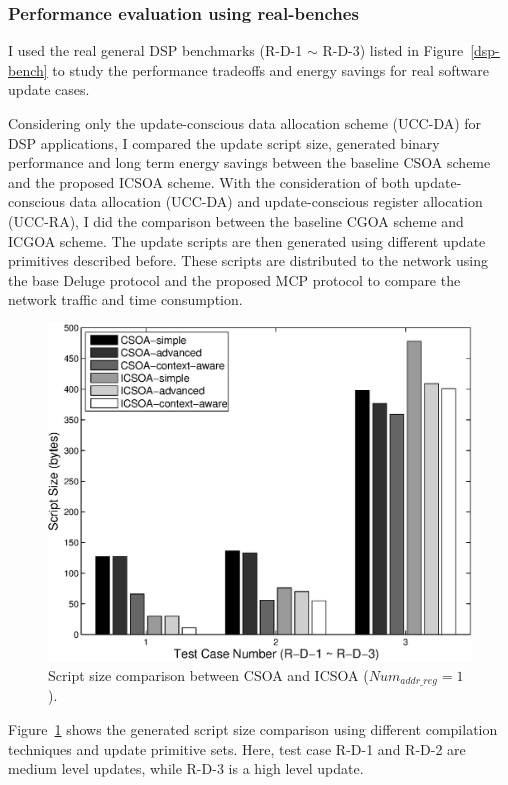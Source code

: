 \subsubsection{Performance evaluation using real-benches}
I used the real general DSP benchmarks (R-D-1 $\sim$ R-D-3)
listed in Figure~\ref{dsp-bench} to study the performance tradeoffs and
energy savings for real software update cases.

Considering only the update-conscious data allocation scheme (UCC-DA) for DSP applications,
I compared the update script size, generated binary performance and long term energy savings
between the baseline CSOA scheme and the proposed ICSOA scheme.
With the consideration of both update-conscious data allocation (UCC-DA) and update-conscious
register allocation (UCC-RA), I did the comparison between the baseline CGOA scheme and ICGOA scheme.
The update scripts are then generated using different update primitives described before. These scripts are distributed 
to the network using the base Deluge protocol and the proposed MCP protocol to compare the network traffic and time 
consumption.

\begin{figure}[htbp]
\centering
\includegraphics[scale=0.6]{./figures/update2.eps}
\caption{Script size comparison between CSOA and ICSOA ($Num_{addr\_reg} = 1$).}
\label{update-dsp-real}
\vspace{-0.1in}
\end{figure}

Figure~\ref{update-dsp-real} shows the generated script size comparison using different compilation techniques 
and update primitive sets. Here, test case R-D-1 and R-D-2 are medium level updates, while R-D-3 is a high level 
update. 

